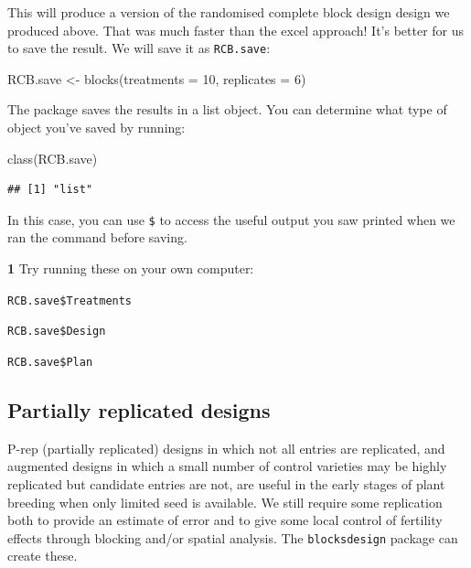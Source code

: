 \documentclass[
]{book}
\makeatletter
\newenvironment{Shaded}{\begin{snugshade}}{\end{snugshade}}
\newcommand{\AttributeTok}[1]{\textcolor[rgb]{0.77,0.63,0.00}{#1}}
\newcommand{\DecValTok}[1]{\textcolor[rgb]{0.00,0.00,0.81}{#1}}
\newcommand{\FunctionTok}[1]{\textcolor[rgb]{0.00,0.00,0.00}{#1}}
\newcommand{\NormalTok}[1]{#1}
\newcommand{\OtherTok}[1]{\textcolor[rgb]{0.56,0.35,0.01}{#1}}
\newenvironment{kframe}{%
\medskip{}
\setlength{\fboxsep}{.8em}
 \def\at@end@of@kframe{}%
 \ifinner\ifhmode%
  \def\at@end@of@kframe{\end{minipage}}%
  \begin{minipage}{\columnwidth}%
 \fi\fi%
 \def\FrameCommand##1{\hskip\@totalleftmargin \hskip-\fboxsep
 \colorbox{shadecolor}{##1}\hskip-\fboxsep
     \hskip-\linewidth \hskip-\@totalleftmargin \hskip\columnwidth}%
 \MakeFramed {\advance\hsize-\width
   \@totalleftmargin\z@ \linewidth\hsize
   \@setminipage}}%
 {\par\unskip\endMakeFramed%
 \at@end@of@kframe}
\newenvironment{rmdblock}[1]
  {
  \begin{itemize}
  \renewcommand{\labelitemi}{
    \raisebox{-.7\height}[0pt][0pt]{
      {\setkeys{Gin}{width=3em,keepaspectratio}\texttt{[image: images/\#1]}}
    }
  }
  \setlength{\fboxsep}{1em}
  \begin{kframe}
  \item
  }
  {
  \end{kframe}
  \end{itemize}
  }
\newenvironment{rmdquiz}
  {\begin{rmdblock}{quiz}}
  {\end{rmdblock}}
\makeatother
\begin{document}
This will produce a version of the randomised complete block design design we produced above. That was much faster than the excel approach! It's better for us to save the result. We will save it as \texttt{RCB.save}:

\begin{Shaded}
\begin{Highlighting}[]
\NormalTok{RCB.save }\OtherTok{\textless{}{-}} \FunctionTok{blocks}\NormalTok{(}\AttributeTok{treatments =} \DecValTok{10}\NormalTok{, }\AttributeTok{replicates =} \DecValTok{6}\NormalTok{)}
\end{Highlighting}
\end{Shaded}

The package saves the results in a list object. You can determine what type of object you've saved by running:

\begin{Shaded}
\begin{Highlighting}[]
\FunctionTok{class}\NormalTok{(RCB.save)}
\end{Highlighting}
\end{Shaded}

\begin{verbatim}
## [1] "list"
\end{verbatim}

In this case, you can use \texttt{\$} to access the useful output you saw printed when we ran the command before saving.

\begin{rmdquiz}
\textbf{1} Try running these on your own computer:

\texttt{RCB.save\$Treatments}

\texttt{RCB.save\$Design}

\texttt{RCB.save\$Plan}
\end{rmdquiz}

\hypertarget{partially-replicated-designs}{%
\subsection{Partially replicated designs}\label{partially-replicated-designs}}

P-rep (partially replicated) designs in which not all entries are replicated, and augmented designs in which a small number of control varieties may be highly replicated but candidate entries are not, are useful in the early stages of plant breeding when only limited seed is available. We still require some replication both to provide an estimate of error and to give some local control of fertility effects through blocking and/or spatial analysis. The \texttt{blocksdesign} package can create these.
\end{document}

